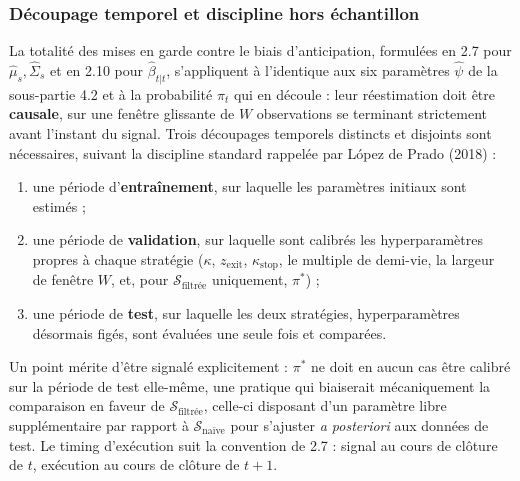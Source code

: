 \documentclass{article}
\begin{document}
\subsubsection*{Découpage temporel et discipline hors échantillon}
La totalité des mises en garde contre le biais d'anticipation, formulées en 2.7 pour $\hat\mu_s,\hat{\Sigma}_s$ et en 2.10 pour $\hat\beta_{t|t}$, s'appliquent à l'identique aux six paramètres $\hat{\psi}$ de la sous-partie 4.2 et à la probabilité $\pi_t$ qui en découle : leur réestimation doit être \textbf{causale}, sur une fenêtre glissante de $W$ observations se terminant strictement avant l'instant du signal. Trois découpages temporels distincts et disjoints sont nécessaires, suivant la discipline standard rappelée par López de Prado (2018) :
\begin{enumerate}
\item une période d'\textbf{entraînement}, sur laquelle les paramètres initiaux sont estimés ;
\item une période de \textbf{validation}, sur laquelle sont calibrés les hyperparamètres propres à chaque stratégie ($\kappa$, $z_{\text{exit}}$, $\kappa_{\text{stop}}$, le multiple de demi-vie, la largeur de fenêtre $W$, et, pour $\mathcal{S}_{\text{filtrée}}$ uniquement, $\pi^\ast$) ;
\item une période de \textbf{test}, sur laquelle les deux stratégies, hyperparamètres désormais figés, sont évaluées une seule fois et comparées.
\end{enumerate}
Un point mérite d'être signalé explicitement : $\pi^\ast$ ne doit en aucun cas être calibré sur la période de test elle-même, une pratique qui biaiserait mécaniquement la comparaison en faveur de $\mathcal{S}_{\text{filtrée}}$, celle-ci disposant d'un paramètre libre supplémentaire par rapport à $\mathcal{S}_{\text{naïve}}$ pour s'ajuster \emph{a posteriori} aux données de test. Le timing d'exécution suit la convention de 2.7 : signal au cours de clôture de $t$, exécution au cours de clôture de $t+1$.
\end{document}
